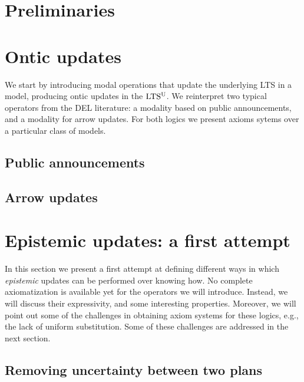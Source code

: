 \documentclass[sn-mathphys-num]{sn-jnl}%
\begin{document}
\section{Preliminaries}
\label{sec:basic}




\section{Ontic updates}
\label{sec:ontic}

We start by introducing modal operations that update the underlying LTS in a model, producing ontic updates in the $\textup{LTS$^\text{\textup{U}}$}$. We reinterpret two typical operators from the DEL literature: a modality based on public announcements, and a modality for arrow updates. For both logics we present axioms sytems over a particular class of models.

\subsection{Public announcements}
\label{sec:pal}


\subsection{Arrow updates}
\label{sec:aul}


\section{Epistemic updates: a first attempt}
\label{sec:epistemic-basic} 

In this section we present a first attempt at defining different  
ways in which  \emph{epistemic} updates can be performed over knowing how. No complete axiomatization is
available yet for the operators we will introduce.  Instead, we will discuss their expressivity, and some interesting properties.
Moreover, we will point out some of the challenges in obtaining axiom systems for these logics, e.g., the lack of uniform substitution. Some of these challenges are addressed in the next section.

\subsection{Removing uncertainty between two plans}
\label{sec:ref}

\end{document}
